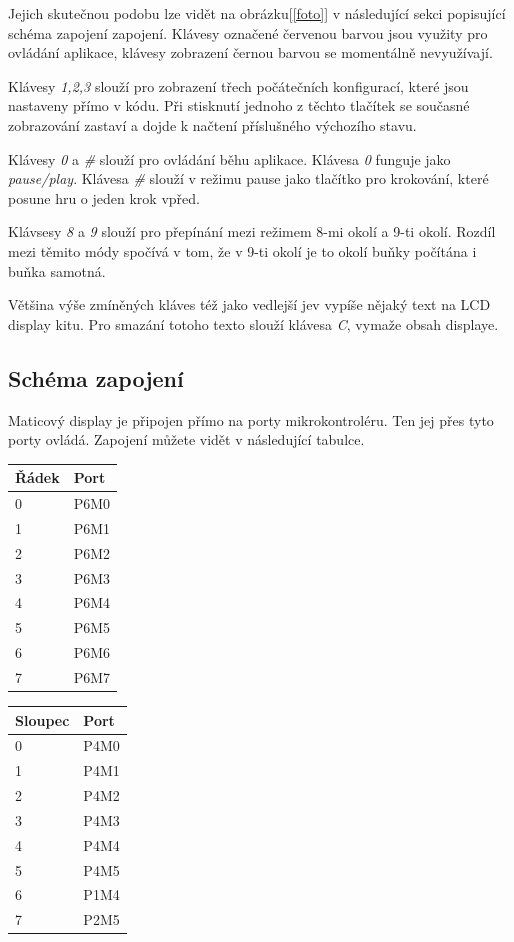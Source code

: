 \documentclass[12pt,a4paper,titlepage]{article}
\begin{document}
Jejich skutečnou podobu lze vidět na obrázku[\ref{foto}] v následující sekci popisující schéma zapojení zapojení. Klávesy označené červenou barvou jsou využity pro ovládání aplikace, klávesy zobrazení černou barvou se momentálně nevyužívají.

Klávesy \textit{1,2,3} slouží pro zobrazení třech počátečních konfigurací, které jsou nastaveny přímo v kódu. Při stisknutí jednoho z těchto tlačítek se současné zobrazování zastaví a dojde k načtení příslušného výchozího stavu.

Klávesy \textit{0} a \textit{\#} slouží pro ovládání běhu aplikace. Klávesa \textit{0} funguje jako \textit{pause/play}. Klávesa \textit{\#} slouží v režimu pause jako tlačítko pro krokování, které posune hru o jeden krok vpřed.

Klávsesy \textit{8} a \textit{9} slouží pro přepínání mezi režimem 8-mi okolí a 9-ti okolí. Rozdíl mezi těmito módy spočívá v tom, že v 9-ti okolí je to okolí buňky počítána i buňka samotná.

Většina výše zmíněných kláves též jako vedlejší jev vypíše nějaký text na LCD display kitu. Pro smazání totoho texto slouží klávesa \textit{C}, vymaže obsah displaye.

\subsection{Schéma zapojení}
Maticový display je připojen přímo na porty mikrokontroléru. Ten jej přes tyto porty ovládá. Zapojení můžete vidět v následující tabulce. 

\begin{minipage}{\linewidth}
\bigskip
\centering
  \begin{tabular}{ | l | l|}
    \hline
    Řádek & Port \\ \hline
    0 & P6M0 \\ \hline
    1 & P6M1  \\ \hline
    2 & P6M2 \\ \hline
	3 & P6M3 \\ \hline
	4 & P6M4 \\ \hline
	5 & P6M5 \\ \hline
	6 & P6M6 \\ \hline
    7 & P6M7  \\
    \hline
  \end{tabular}
  \begin{tabular}{ | l | l|}
    \hline
    Sloupec & Port \\ \hline
    0 & P4M0 \\ \hline
    1 & P4M1  \\ \hline
    2 & P4M2 \\ \hline
	3 & P4M3 \\ \hline
	4 & P4M4 \\ \hline
	5 & P4M5 \\ \hline
	6 & P1M4 \\ \hline
    7 & P2M5  \\
    \hline
  \end{tabular}
   \label{fitkit:display}

\bigskip
\end{minipage}
\end{document}
